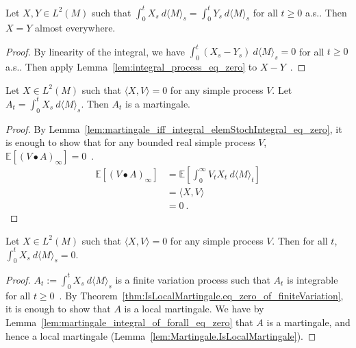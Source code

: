 \begin{lemma}\label{lem:integral_process_injective}
Let $X, Y \in L^2(M)$ such that $\int_0^t X_s \: d\langle M \rangle_s = \int_0^t Y_s \: d\langle M \rangle_s$ for all $t \ge 0$ a.s.. Then $X = Y$ almost everywhere.
\end{lemma}

\begin{proof}
By linearity of the integral, we have $\int_0^t (X_s - Y_s) \: d\langle M \rangle_s = 0$ for all $t \ge 0$ a.s..
Then apply Lemma~\ref{lem:integral_process_eq_zero} to $X - Y$~.
\end{proof}


\begin{lemma}\label{lem:martingale_integral_of_forall_eq_zero}
Let $X \in L^2(M)$ such that $\langle X, V\rangle = 0$ for any simple process $V$. Let $A_t = \int_0^t X_s \: d\langle M \rangle_s$. Then $A_t$ is a martingale.
\end{lemma}

\begin{proof}
By Lemma~\ref{lem:martingale_iff_integral_elemStochIntegral_eq_zero}, it is enough to show that for any bounded real simple process $V$, $\mathbb{E}[(V \bullet A)_\infty] = 0$~.
\begin{align*}
  \mathbb{E}\left[(V \bullet A)_\infty\right]
  &= \mathbb{E}\left[ \int_0^{\infty} V_t X_t \: d\langle M \rangle_t \right]
  \\
  &= \langle X, V \rangle
  \\
  &= 0
  \: .
\end{align*}
\end{proof}


\begin{lemma}\label{lem:integral_eq_zero_of_forall_eq_zero}
Let $X \in L^2(M)$ such that $\langle X, V\rangle = 0$ for any simple process $V$. Then for all $t$, $\int_0^t X_s \: d\langle M \rangle_s = 0$.
\end{lemma}

\begin{proof}
$A_t := \int_0^t X_s \: d\langle M \rangle_s$ is a finite variation process such that $A_t$ is integrable for all $t \ge 0$~.
By Theorem~\ref{thm:IsLocalMartingale.eq_zero_of_finiteVariation}, it is enough to show that $A$ is a local martingale. We have by Lemma~\ref{lem:martingale_integral_of_forall_eq_zero} that $A$ is a martingale, and hence a local martingale (Lemma~\ref{lem:Martingale.IsLocalMartingale}).
\end{proof}


